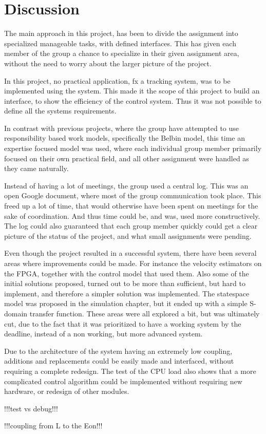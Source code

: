 \chapter{Discussion}\label{chap:discussion}
The main approach in this project, has been to divide the assignment into specialized manageable tasks, with defined interfaces.  This has given each member of the group a chance to specialize in their given assignment area, without the need to worry about the larger picture of the project.

In this project, no practical application, fx a tracking system, was to be implemented using the system.
This made it the scope of this project to build an interface, to show the efficiency of the control system. Thus it was not possible to define all the systems requirements.

In contrast with previous projects, where the group have attempted to use responsibility based work models, specifically the Belbin model, this time an expertise focused model was used, where each individual group member primarily focused on their own practical field, and all other assignment were handled as they came naturally. 

Instead of having a lot of meetings, the group used a central log. This was an open Google document, where most of the  group communication took place. This freed up a lot of time, that would otherwise have been spent on meetings for the sake of coordination. And thus time could be, and was, used more constructively. The log could also guaranteed that each group member quickly could get a clear picture of the status of the project, and what small assignments were pending.

Even though the project resulted in a successful system, there have been several areas where improvements could be made. For instance the velocity estimators on the FPGA, together with the control model that used them.
Also some of the initial solutions proposed, turned out to be more than sufficient, but hard to implement, and therefore a simpler solution was implemented. The statespace model was proposed in the simulation chapter, but it ended up with a simple S-domain transfer function. These areas were all explored a bit, but was ultimately cut, due to the fact that it was prioritized to have a working system by the deadline, instead of a non working, but more advanced system.

Due to the architecture of the system having an extremely low coupling, additions and replacements could be easily made and interfaced, without requiring a complete redesign. The test of the CPU load also shows that a more complicated control algorithm could be implemented without requiring new hardware, or redesign of other modules.

!!!test vs debug!!!

!!!coupling from L to the Eon!!!
